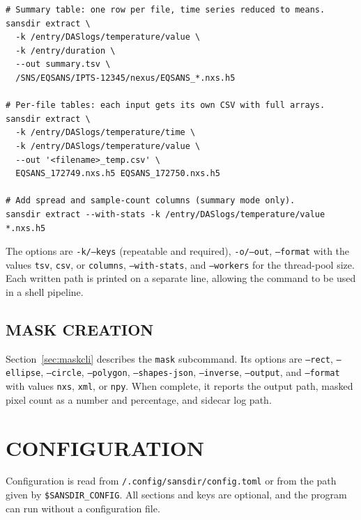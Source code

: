 \documentclass[tm]{ornltm}
\newcommand{\hme}{\raisebox{0.4ex}{\texttildelow}}
\begin{document}
\begin{lstlisting}[language=shellsession]
# Summary table: one row per file, time series reduced to means.
sansdir extract \
  -k /entry/DASlogs/temperature/value \
  -k /entry/duration \
  --out summary.tsv \
  /SNS/EQSANS/IPTS-12345/nexus/EQSANS_*.nxs.h5

# Per-file tables: each input gets its own CSV with full arrays.
sansdir extract \
  -k /entry/DASlogs/temperature/time \
  -k /entry/DASlogs/temperature/value \
  --out '<filename>_temp.csv' \
  EQSANS_172749.nxs.h5 EQSANS_172750.nxs.h5

# Add spread and sample-count columns (summary mode only).
sansdir extract --with-stats -k /entry/DASlogs/temperature/value *.nxs.h5
\end{lstlisting}

The options are \texttt{-k/--keys} (repeatable and required),
\texttt{-o/--out}, \texttt{--format} with the values \texttt{tsv},
\texttt{csv}, or \texttt{columns}, \texttt{--with-stats}, and
\texttt{--workers} for the thread-pool size. Each written path is printed on a
separate line, allowing the command to be used in a shell pipeline.

\subsection{MASK CREATION}

Section~\ref{sec:maskcli} describes the \texttt{mask} subcommand. Its options
are \texttt{--rect}, \texttt{--ellipse}, \texttt{--circle}, \texttt{--polygon},
\texttt{--shapes-json}, \texttt{--inverse}, \texttt{--output}, and
\texttt{--format} with values \texttt{nxs}, \texttt{xml}, or \texttt{npy}. When
complete, it reports the output path, masked pixel count as a number and
percentage, and sidecar log path.

\section{CONFIGURATION}
\label{sec:config}

Configuration is read from \texttt{\hme/.config/sansdir/config.toml} or from the
path given by \texttt{\$SANSDIR\_CONFIG}. All sections and keys are optional, and
the program can run without a configuration file.
\end{document}
